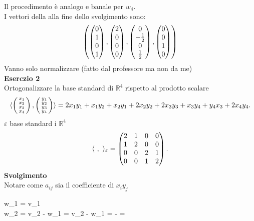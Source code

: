 \documentclass[12px]{article}
\begin{document}
	Il procedimento è analogo e banale per $w_4$.\\
	I vettori della alla fine dello svolgimento sono:
\[
	\left(\begin{pmatrix}0\\1\\0\\1\end{pmatrix},\begin{pmatrix}2\\0\\0\\0\end{pmatrix},\begin{pmatrix}0\\-\frac{1}{2}\\0\\\frac{1}{2}\end{pmatrix},\begin{pmatrix}0\\0\\1\\0\end{pmatrix}\right)
 \]
 Vanno solo normalizzare (fatto dal professore ma non da me)
 \newpage
 \hline\ \\
 \textbf{Eserczio 2} \\ 
 Ortogonalizzare la base standard di $\mathbb{R}^4$ rispetto al prodotto scalare
 \[
	 \langle \left(\begin{smallmatrix}x_1\\x_2\\x_3\\x_4\end{smallmatrix}\right),\left(\begin{smallmatrix}y_1\\y_2\\y_3\\y_4\end{smallmatrix}\right)  \rangle = 2x_1y_1 + x_1y_2 + x_2y_1 + 2x_2y_2 + 2x_3y_3 + x_3y_4 + y_4x_3 + 2x_4y_4
 .\] 
$\varepsilon$  base standard i $\mathbb{R}^4$ 
\[
	\langle \ , \  \rangle_\varepsilon = \begin{pmatrix}2 & 1 & 0 & 0 \\ 1 & 2 & 0 & 0 \\ 0 & 0 & 2 & 1 \\ 0 & 0 & 1 & 2\end{pmatrix}
.\]
\textbf{Svolgimento} \\
Notare come $a_{ij}$ sia il coefficiente di $x_iy_j$\\
\begin{aligend}
	w_1 = v_1\\
	w_2 = v_2 - w_1 = v_2 - w_1 =  -  = 
\end{aligend} \\
\end{document}
